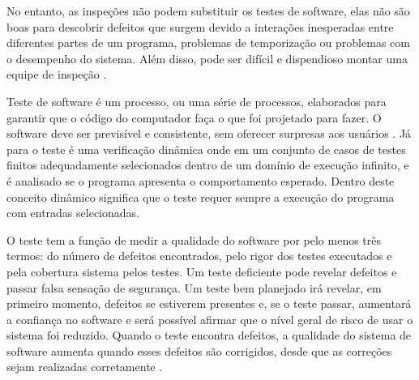 No entanto, as inspeções não podem substituir os testes de software, elas não são boas para descobrir defeitos que surgem devido a interações inesperadas entre diferentes partes de um programa, problemas de temporização ou problemas com o desempenho do sistema. Além disso, pode ser difícil e dispendioso montar uma equipe de inspeção \cite{sommerville2010}. 
% 
% 
% 
% 
% 
% 



Teste de software é um processo, ou uma série de processos, elaborados para garantir que o código do computador faça o que foi projetado para fazer. O software deve ser previsível e consistente, sem oferecer surpresas aos usuários \cite{myers2011art}. Já para \cite{bourque2014guide} o teste é uma verificação dinâmica onde em um conjunto de casos de testes finitos adequadamente selecionados dentro de um domínio de execução infinito, e é analisado se o programa apresenta o comportamento esperado. Dentro deste conceito dinâmico significa que o teste requer sempre a execução do programa com entradas selecionadas.

O teste tem a função de medir a qualidade do software por pelo menos três termos: do número de defeitos encontrados, pelo rigor dos testes executados e pela cobertura sistema pelos testes. Um teste deficiente pode revelar defeitos e passar falsa sensação de segurança. Um teste bem planejado irá revelar, em primeiro momento, defeitos se estiverem presentes e, se o teste passar, aumentará a confiança no software e será possível afirmar que o nível geral de risco de usar o sistema foi reduzido. Quando o teste encontra defeitos, a qualidade do sistema de software aumenta quando esses defeitos são corrigidos, desde que as correções sejam realizadas corretamente \cite{graham2008foundations}.
% 
% 

